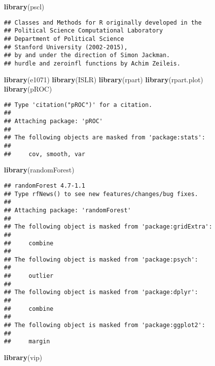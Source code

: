 \documentclass[
]{article}
\newenvironment{Shaded}{\begin{snugshade}}{\end{snugshade}}
\newcommand{\FunctionTok}[1]{\textcolor[rgb]{0.13,0.29,0.53}{\textbf{#1}}}
\newcommand{\NormalTok}[1]{#1}
\begin{document}
\begin{Shaded}
\begin{Highlighting}[]
\FunctionTok{library}\NormalTok{(pscl)}
\end{Highlighting}
\end{Shaded}

\begin{verbatim}
## Classes and Methods for R originally developed in the
## Political Science Computational Laboratory
## Department of Political Science
## Stanford University (2002-2015),
## by and under the direction of Simon Jackman.
## hurdle and zeroinfl functions by Achim Zeileis.
\end{verbatim}

\begin{Shaded}
\begin{Highlighting}[]
\FunctionTok{library}\NormalTok{(e1071)}
\FunctionTok{library}\NormalTok{(ISLR)}
\FunctionTok{library}\NormalTok{(rpart)}
\FunctionTok{library}\NormalTok{(rpart.plot)}
\FunctionTok{library}\NormalTok{(pROC)}
\end{Highlighting}
\end{Shaded}

\begin{verbatim}
## Type 'citation("pROC")' for a citation.
## 
## Attaching package: 'pROC'
## 
## The following objects are masked from 'package:stats':
## 
##     cov, smooth, var
\end{verbatim}

\begin{Shaded}
\begin{Highlighting}[]
\FunctionTok{library}\NormalTok{(randomForest)}
\end{Highlighting}
\end{Shaded}

\begin{verbatim}
## randomForest 4.7-1.1
## Type rfNews() to see new features/changes/bug fixes.
## 
## Attaching package: 'randomForest'
## 
## The following object is masked from 'package:gridExtra':
## 
##     combine
## 
## The following object is masked from 'package:psych':
## 
##     outlier
## 
## The following object is masked from 'package:dplyr':
## 
##     combine
## 
## The following object is masked from 'package:ggplot2':
## 
##     margin
\end{verbatim}

\begin{Shaded}
\begin{Highlighting}[]
\FunctionTok{library}\NormalTok{(vip)}
\end{Highlighting}
\end{Shaded}
\end{document}
